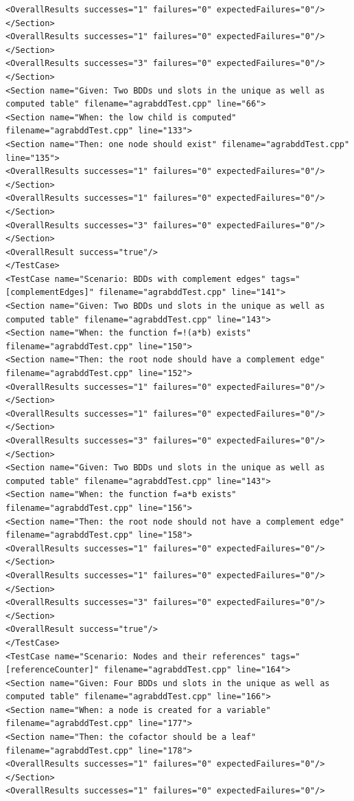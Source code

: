 \begin{verbatim}
<OverallResults successes="1" failures="0" expectedFailures="0"/>
</Section>
<OverallResults successes="1" failures="0" expectedFailures="0"/>
</Section>
<OverallResults successes="3" failures="0" expectedFailures="0"/>
</Section>
<Section name="Given: Two BDDs und slots in the unique as well as computed table" filename="agrabddTest.cpp" line="66">
<Section name="When: the low child is computed" filename="agrabddTest.cpp" line="133">
<Section name="Then: one node should exist" filename="agrabddTest.cpp" line="135">
<OverallResults successes="1" failures="0" expectedFailures="0"/>
</Section>
<OverallResults successes="1" failures="0" expectedFailures="0"/>
</Section>
<OverallResults successes="3" failures="0" expectedFailures="0"/>
</Section>
<OverallResult success="true"/>
</TestCase>
<TestCase name="Scenario: BDDs with complement edges" tags="[complementEdges]" filename="agrabddTest.cpp" line="141">
<Section name="Given: Two BDDs und slots in the unique as well as computed table" filename="agrabddTest.cpp" line="143">
<Section name="When: the function f=!(a*b) exists" filename="agrabddTest.cpp" line="150">
<Section name="Then: the root node should have a complement edge" filename="agrabddTest.cpp" line="152">
<OverallResults successes="1" failures="0" expectedFailures="0"/>
</Section>
<OverallResults successes="1" failures="0" expectedFailures="0"/>
</Section>
<OverallResults successes="3" failures="0" expectedFailures="0"/>
</Section>
<Section name="Given: Two BDDs und slots in the unique as well as computed table" filename="agrabddTest.cpp" line="143">
<Section name="When: the function f=a*b exists" filename="agrabddTest.cpp" line="156">
<Section name="Then: the root node should not have a complement edge" filename="agrabddTest.cpp" line="158">
<OverallResults successes="1" failures="0" expectedFailures="0"/>
</Section>
<OverallResults successes="1" failures="0" expectedFailures="0"/>
</Section>
<OverallResults successes="3" failures="0" expectedFailures="0"/>
</Section>
<OverallResult success="true"/>
</TestCase>
<TestCase name="Scenario: Nodes and their references" tags="[referenceCounter]" filename="agrabddTest.cpp" line="164">
<Section name="Given: Four BDDs und slots in the unique as well as computed table" filename="agrabddTest.cpp" line="166">
<Section name="When: a node is created for a variable" filename="agrabddTest.cpp" line="177">
<Section name="Then: the cofactor should be a leaf" filename="agrabddTest.cpp" line="178">
<OverallResults successes="1" failures="0" expectedFailures="0"/>
</Section>
<OverallResults successes="1" failures="0" expectedFailures="0"/>

\end{verbatim}
